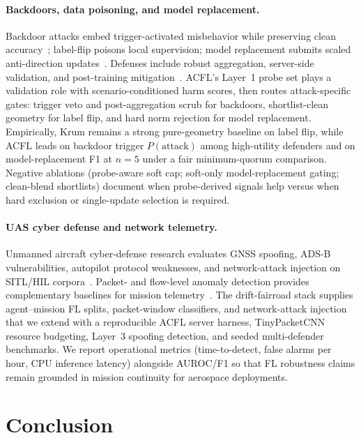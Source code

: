 \documentclass[journal]{IEEEtran}
\begin{document}
\paragraph{Backdoors, data poisoning, and model replacement.}
Backdoor attacks embed trigger-activated misbehavior while preserving clean accuracy~\cite{gu2017badnets,bagdasaryan2020backdoor,xie2019dba,sun2019can}; label-flip poisons local supervision; model replacement submits scaled anti-direction updates~\cite{baruch2019little,bhagoji2019analyzing,fang2020local}.
Defenses include robust aggregation, server-side validation, and post-training mitigation~\cite{cao2021fltrust,nguyen2022flame}.
ACFL's Layer~1 probe set plays a validation role with scenario-conditioned harm scores, then routes attack-specific gates: trigger veto and post-aggregation scrub for backdoors, shortlist-clean geometry for label flip, and hard norm rejection for model replacement.
Empirically, Krum remains a strong pure-geometry baseline on label flip, while ACFL leads on backdoor trigger $P(\text{attack})$ among high-utility defenders and on model-replacement F1 at $n{=}5$ under a fair minimum-quorum comparison.
Negative ablations (probe-aware soft cap; soft-only model-replacement gating; clean-blend shortlists) document when probe-derived signals help versus when hard exclusion or single-update selection is required.

\paragraph{UAS cyber defense and network telemetry.}
Unmanned aircraft cyber-defense research evaluates GNSS spoofing, ADS-B vulnerabilities, autopilot protocol weaknesses, and network-attack injection on SITL/HIL corpora~\cite{humphreys2008spoofing,tippenhauer2011gps,strohmeier2011adsb,yaacoub2020uav,ernst2021uavids,hoang2019mavlink,shakhatreh2019uav}.
Packet- and flow-level anomaly detection provides complementary baselines for mission telemetry~\cite{chandola2009anomaly}.
The drift-fairroad stack supplies agent--mission FL splits, packet-window classifiers, and network-attack injection that we extend with a reproducible ACFL server harness, TinyPacketCNN resource budgeting, Layer~3 spoofing detection, and seeded multi-defender benchmarks.
We report operational metrics (time-to-detect, false alarms per hour, CPU inference latency) alongside AUROC/F1 so that FL robustness claims remain grounded in mission continuity for aerospace deployments.

\section{Conclusion}
\label{sec:conclusion}
\end{document}
